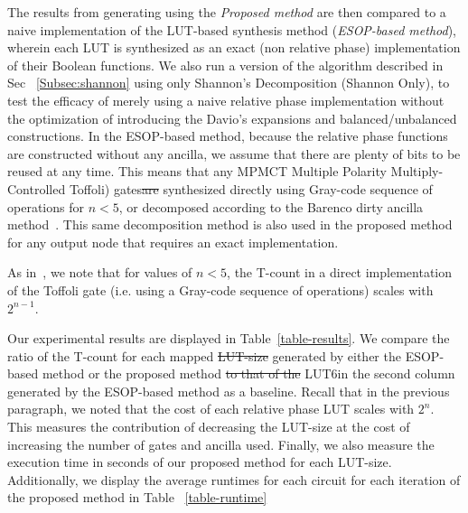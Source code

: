 \documentclass[paper]{ieice}
\providecommand{\DIFadd}[1]{{\protect\color{blue}{#1}}} %
\providecommand{\DIFdel}[1]{{\protect\color{red}\sout{#1}}}                      %
\providecommand{\DIFaddbegin}{} %
\providecommand{\DIFaddend}{} %
\providecommand{\DIFdelbegin}{} %
\providecommand{\DIFdelend}{} %
\newcommand{\DIFscaledelfig}{0.5}
\newlength{\DIFdelgraphicswidth} %
\newlength{\DIFdelgraphicsheight} %
\newcommand{\DIFaddincludegraphics}[2][]{{\color{blue}\fbox{\DIFOincludegraphics[#1]{#2}}}} %
\newcommand{\DIFdelincludegraphics}[2][]{%
\sbox{\DIFdelgraphicsbox}{\DIFOincludegraphics[#1]{#2}}%
\settoboxwidth{\DIFdelgraphicswidth}{\DIFdelgraphicsbox} %
\settoboxtotalheight{\DIFdelgraphicsheight}{\DIFdelgraphicsbox} %
\scalebox{\DIFscaledelfig}{%
\parbox[b]{\DIFdelgraphicswidth}{\usebox{\DIFdelgraphicsbox}\\[-\baselineskip] \rule{\DIFdelgraphicswidth}{0em}}\llap{\resizebox{\DIFdelgraphicswidth}{\DIFdelgraphicsheight}{%
\setlength{\unitlength}{\DIFdelgraphicswidth}%
\begin{picture}(1,1)%
\thicklines\linethickness{2pt} %
{\color[rgb]{1,0,0}\put(0,0){\framebox(1,1){}}}%
{\color[rgb]{1,0,0}\put(0,0){\line( 1,1){1}}}%
{\color[rgb]{1,0,0}\put(0,1){\line(1,-1){1}}}%
\end{picture}%
}\hspace*{3pt}}} %
} %
\DeclareRobustCommand{\DIFaddbegin}{\DIFOaddbegin \let\includegraphics\DIFaddincludegraphics} %
\DeclareRobustCommand{\DIFaddend}{\DIFOaddend \let\includegraphics\DIFOincludegraphics} %
\DeclareRobustCommand{\DIFdelbegin}{\DIFOdelbegin \let\includegraphics\DIFdelincludegraphics} %
\DeclareRobustCommand{\DIFdelend}{\DIFOaddend \let\includegraphics\DIFOincludegraphics} %
\begin{document}
The results from generating using the {\it Proposed method}  are then compared to a naive implementation of the LUT-based synthesis method (\DIFaddbegin {\it \DIFaddend ESOP-based method\DIFaddbegin }\DIFaddend ), wherein each LUT is synthesized as an exact (non relative phase) implementation of their Boolean functions. We also run a version of the algorithm described in Sec ~\ref{Subsec:shannon} using only Shannon's Decomposition (Shannon Only), to test the efficacy of merely using a naive relative phase implementation without the optimization of introducing the Davio's expansions and balanced/unbalanced constructions. In the ESOP-based method, because the relative phase functions are constructed without any ancilla, we assume that there are plenty of bits to be reused at any time. This means that any MPMCT Multiple Polarity Multiply-Controlled Toffoli) gates\DIFdelbegin \DIFdel{are }\DIFdelend \DIFaddbegin \DIFadd{, which are MCT gates that allow for negated inputs, are }\DIFaddend synthesized directly using Gray-code sequence of operations for $n<5$, or decomposed according to the Barenco dirty ancilla method\DIFaddbegin \DIFadd{, both described in }\DIFaddend ~\cite{bib-barenco-elementary}. This same decomposition method is also used in the proposed method for any output node that requires an exact implementation.

As in~\cite{bib-barenco-elementary}, we note that for values of $n<5$, the T-count in a direct implementation of the Toffoli gate (i.e. using a Gray-code sequence of operations) scales with $2^{n-1}$.

Our experimental results are displayed in Table~\ref{table-results}. We compare the ratio of the T-count for
each mapped \DIFdelbegin \DIFdel{LUT-size }\DIFdelend \DIFaddbegin \DIFadd{LUT }\DIFaddend generated by either the ESOP-based method or the proposed method \DIFdelbegin \DIFdel{to that of the }\DIFdelend \DIFaddbegin \DIFadd{with that of }\DIFaddend LUT6\DIFaddbegin \DIFadd{, which is the upper bound of our range, }\DIFaddend in the second column generated by the ESOP-based method as a baseline.  \DIFaddbegin \DIFadd{This should give us the least optimized circuit with the least amount of ancilla. }\DIFaddend Recall that in the previous paragraph, we noted that the cost of each relative phase LUT scales with $2^n$. This measures the contribution of decreasing the LUT-size at the cost of increasing the number of gates and ancilla used. \DIFaddbegin \DIFadd{We take the arithmetic mean of the gain of all circuits and display it in the "Average" row. }\DIFaddend Finally, we also measure the execution time in seconds of our proposed method for each LUT-size. Additionally, we display the average runtimes for each circuit for each iteration of the proposed method in Table ~\ref{table-runtime}\DIFdelbegin %
\end{document}
